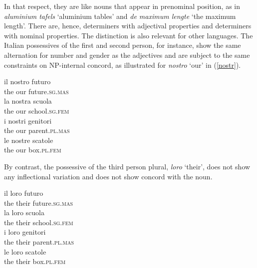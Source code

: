 \documentclass[output=paper
                ,modfonts
                ,nonflat
	        ,collection
	        ,collectionchapter
	        ,collectiontoclongg
 	        ,biblatex
                ,babelshorthands
                ,newtxmath
                ,draftmode
                ,colorlinks, citecolor=brown
]{./langsci/langscibook}
\begin{document}
\noindent
In that respect, they are like nouns that appear in prenominal position,
as in \emph{aluminium tafels} `aluminium tables' and \emph{de maximum lengte}
`the maximum length'. There are, hence, determiners with adjectival 
properties and determiners with nominal properties.   
The distinction is also relevant for other languages. The Italian 
possessives of the first and second person, for instance, 
show the same alternation for number and gender as the adjectives
and are subject to the same constraints on NP-internal concord, as illustrated 
for \emph{nostro} `our' in (\ref{nostr}). 

\begin{exe}  
\ex\label{nostr} 
\begin{xlist}
\ex 
\gll  il nostro futuro \\
      the our future.\textsc{sg.mas} \\ 
\ex 
\gll  la nostra scuola  \\
      the our school.\textsc{sg.fem} \\ 
\ex 
\gll  i nostri genitori \\
      the our parent.\textsc{pl.mas} \\ 
\ex 
\gll  le nostre scatole \\
      the our box.\textsc{pl.fem} \\ 
\end{xlist}
\end{exe} 

\noindent
By contrast, the possessive of the third person plural, \emph{loro} `their',
does not show any inflectional variation and does not show concord with the noun.

\begin{exe} 
\ex 
\begin{xlist}
\ex 
\gll  il loro futuro \\   
      the their future.\textsc{sg.mas}  \\ 
\ex 
\gll  la loro scuola  \\   
      the their school.\textsc{sg.fem}   \\ 
\ex 
\gll  i loro genitori \\   
      the their parent.\textsc{pl.mas} \\ 
\ex 
\gll  le loro scatole \\   
      the their box.\textsc{pl.fem} \\ 
\end{xlist} 
\end{exe}
\end{document}
